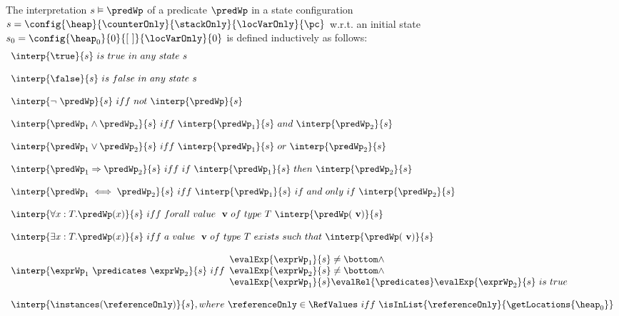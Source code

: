 \begin{interpPred} \label{interpPred} 
The interpretation $ s \vDash \predWp$ of a predicate $\predWp$ in a state configuration $s = \config{\heap}{\counterOnly}{ \stackOnly }{\locVarOnly}{\pc }$ 
w.r.t. an initial state  $ s_{0} = \config{\heap_{0}}{ 0 }{ \lbrack \ \rbrack  }{\locVarOnly}{ 0 } $ is defined inductively as follows:
$$
\begin{array}{l}
\interp{\true}{s} \  is \ true \ in \ any \ state \ s \\
\\
\interp{\false}{s} \ is \ false \ in \ any \ state \ s \\
\\
\interp{  \neg \ \predWp  }{s} \ iff \  not \ \interp{\predWp}{s} \\ 
\\

\interp{\predWp_1  \wedge  \predWp_2 }{s} \ iff \ \interp{\predWp_1}{s} \ and \ \interp{\predWp_2}{s}  \\
\\

\interp{\predWp_1  \vee  \predWp_2 }{s} \ iff \ \interp{\predWp_1}{s} \ or \ \interp{\predWp_2}{s}  \\
\\
\interp{\predWp_1  \Rightarrow  \predWp_2 }{s} \ iff \ if \ \interp{\predWp_1}{s} \ then \ \interp{\predWp_2}{s}  \\
\\
\interp{\predWp_1  \iff \predWp_2 }{s} \ iff \  \interp{\predWp_1}{s} \ if \ and \ only \ if  \ \interp{\predWp_2}{s}  \\
\\
\interp{\forall x : T .  \predWp(x)   }{s} \ iff \ forall \ value \ \mbox{ \rm \textbf{v}} \ of \  type \  T \ \interp{\predWp(\mbox{ \rm \textbf{v}})}{s}  \\
\\

\interp{\exists x : T .  \predWp(x)   }{s} \ iff \ a \ value \ \mbox{ \rm \textbf{v}} \ of \  type \  T \ exists \ such \ that \ \interp{\predWp(\mbox{ \rm \textbf{v}})}{s}  \\
\\
\interp{\exprWp_1 \  \predicates \  \exprWp_2 }{s} \ iff \begin{array}{l}
                                                              \evalExp{\exprWp_1 }{s} \neq \bottom \wedge \\
							       \evalExp{\exprWp_2 }{s}\neq \bottom \wedge \\
                                                             \evalExp{\exprWp_1 }{s} \evalRel{\predicates }  \evalExp{\exprWp_2 }{s} \ is  \ true

							     \end{array} \\
\\

\interp{\instances(\referenceOnly) }{s}, where \ \referenceOnly \in \RefValues \ iff \    \isInList{\referenceOnly }{ \getLocations{\heap_{0}}}  
\end{array}
$$   
\end{interpPred}
